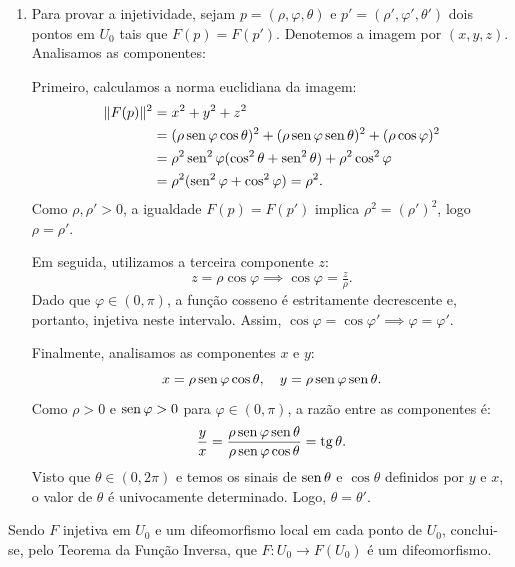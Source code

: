 {\begin{enumerate}
		\item Para provar a injetividade, sejam $p = (\rho, \varphi, \theta)$ e $p' = (\rho', \varphi', \theta')$ dois pontos em $U_0$ tais que $F(p) = F(p')$. Denotemos a imagem por $(x,y,z)$. Analisamos as componentes:
		
		Primeiro, calculamos a norma euclidiana da imagem:
		\begin{align*}
			\|F(p)\|^2 &= x^2 + y^2 + z^2 \\
			&= (\rho \operatorname{sen} \varphi \cos \theta)^2 + (\rho \operatorname{sen} \varphi \operatorname{sen} \theta)^2 + (\rho \cos \varphi)^2 \\
			&= \rho^2 \operatorname{sen}^2 \varphi (\cos^2 \theta + \operatorname{sen}^2 \theta) + \rho^2 \cos^2 \varphi \\
			&= \rho^2 (\operatorname{sen}^2 \varphi + \cos^2 \varphi) = \rho^2.
		\end{align*}
		Como $\rho, \rho' > 0$, a igualdade $F(p) = F(p')$ implica $\rho^2 = (\rho')^2$, logo $\rho = \rho'$.
		
		Em seguida, utilizamos a terceira componente $z$:
		\begin{equation*}
			z = \rho \cos \varphi \implies \cos \varphi = \tfrac{z}{\rho}.
		\end{equation*}
		Dado que $\varphi \in (0, \pi)$, a função cosseno é estritamente decrescente e, portanto, injetiva neste intervalo. Assim, $\cos \varphi = \cos \varphi' \implies \varphi = \varphi'$.
		
		Finalmente, analisamos as componentes $x$ e $y$:
		\begin{equation*}
			x = \rho \operatorname{sen} \varphi \cos \theta, \quad y = \rho \operatorname{sen} \varphi \operatorname{sen} \theta.
		\end{equation*}
		Como $\rho > 0$ e $\operatorname{sen} \varphi > 0$ para $\varphi \in (0, \pi)$, a razão entre as componentes é:
		\begin{equation*}
			\frac{y}{x} = \frac{\rho \operatorname{sen} \varphi \operatorname{sen} \theta}{\rho \operatorname{sen} \varphi \cos \theta} = \operatorname{tg} \theta.
		\end{equation*}
		Visto que $\theta \in (0, 2\pi)$ e temos os sinais de $\operatorname{sen} \theta$ e $\cos \theta$ definidos por $y$ e $x$, o valor de $\theta$ é univocamente determinado. Logo, $\theta = \theta'$.
	\end{enumerate}
	
	Sendo $F$ injetiva em $U_0$ e um difeomorfismo local em cada ponto de $U_0$, conclui-se, pelo Teorema da Função Inversa, que $F : U_0 \to F(U_0)$ é um difeomorfismo.
}


